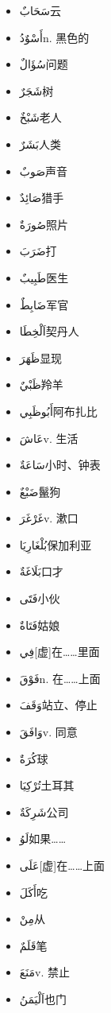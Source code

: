 \begin{itemize}
    \item {} \ac{سَحَابٌ}{云}
    \item \ac{أَسْوٌدُ}{n. 黑色的}
    \item \ac{سُؤَالٌ}{问题}
    \item \ac{شَجَرٌ}{树}
    \item \ac{شَبْخٌ}{老人}
    \item \ac{بَشَرٌ}{人类}
    \item \ac{صَوبٌ}{声音}
    \item \ac{صَائِدٌ}{猎手}
    \item \ac{صُورَةٌ}{照片}
    \item \ac{ضَرَبَ}{打}
    \item \ac{طَبِيبٌ}{医生}
    \item \ac{ضَابِطٌ}{军官}
    \item \ac{اَلْخِطَا}{契丹人}
    \item \ac{ظَهَرَ}{显现}
    \item \ac{ظَبْيٌ}{羚羊}
    \item \ac{أَبُوظَبِي}{阿布扎比}
    \item \ac{عَاشَ}{v. 生活}
    \item \ac{سَاعَةٌ}{小时、钟表}
    \item \ac{ضَبْعٌ}{鬣狗}
    \item \ac{غَرْغَرَ}{v. 漱口}
    \item \ac{بُلْغَارِيَا}{保加利亚}
    \item \ac{بَلَاغَةٌ}{口才}
    
    \item {} \ac{فَتََى}{小伙}
    \item \ac{فَتَاةٌ}{姑娘}
    \item \ac{فِي}{[虚]在……里面}
    \item \ac{فَوْقَ}{n. 在……上面}
    \item \ac{وَقَفَ}{站立、停止}
    \item \ac{وَافَقَ}{v. 同意}
    \item \ac{كُرَةٌ}{球}
    \item \ac{تُرْكِيَا}{土耳其}
    \item \ac{شَرِكَةٌ}{公司}
    \item \ac{لَوُ}{如果……}
    \item \ac{عَلَى}{[虚]在……上面}
    \item \ac{أَكَلَ}{吃}
    \item \ac{مِنْ}{从}
    \item \ac{قَلَمٌ}{笔}
    \item \ac{مَنَعَ}{v. 禁止}
    \item \ac{اَلْيَمَنُ}{也门}
\end{itemize}


